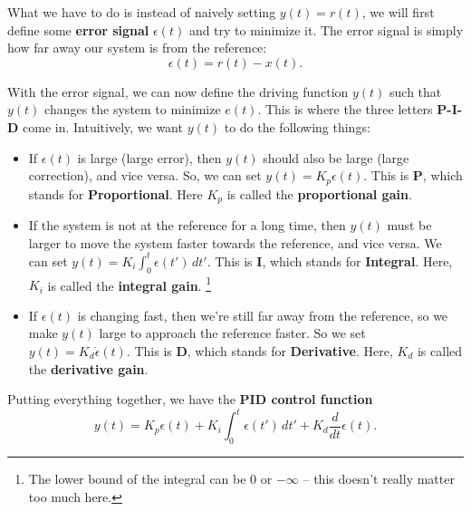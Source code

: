 \documentclass{article}
\theoremstyle{definition}
\newcommand{\f}[2]{\frac{#1}{#2}}
\begin{document}
What we have to do is instead of naively setting $y(t) = r(t)$, we will first define some \textbf{error signal} $\epsilon(t)$ and try to minimize it. The error signal is simply how far away our system is from the reference:
\begin{equation*}
\epsilon(t) = r(t) - x(t).
\end{equation*}

\noindent With the error signal, we can now define the driving function $y(t)$ such that $y(t)$ changes the system to minimize $e(t)$. This is where the three letters \textbf{P-I-D} come in. Intuitively, we want $y(t)$ to do the following things:
\begin{itemize}
	\item If $\epsilon(t)$ is large (large error), then $y(t)$ should also be large (large correction), and vice versa. So, we can set $y(t) = K_p \epsilon(t)$. This is \textbf{P}, which stands for \textbf{Proportional}. Here $K_p$ is called the \textbf{proportional gain}. 
	
	
	\item If the system is not at the reference for a long time, then $y(t)$ must be larger to move the system faster towards the reference, and vice versa. We can set $y(t) = K_i \int_0^t \epsilon(t')\,dt'$. This is \textbf{I}, which stands for \textbf{Integral}. Here, $K_i$ is called the \textbf{integral gain}. \footnote{The lower bound of the integral can be $0$ or $-\infty$ -- this doesn't really matter too much here.}
	
	
	\item If $\epsilon(t)$ is changing fast, then we're still far away from the reference, so we make $y(t)$ large to approach the reference faster. So we set $y(t)= K_d \dot{\epsilon}(t)$. This is \textbf{D}, which stands for \textbf{Derivative}. Here, $K_d$ is called the \textbf{derivative gain}. 
\end{itemize} 

Putting everything together, we have the \textbf{PID control function}
\begin{equation*}
y(t) = K_p \epsilon(t) + K_i \int_0^t \epsilon(t')\,dt' + K_d \f{d}{dt}\epsilon(t).
\end{equation*}
\end{document}
